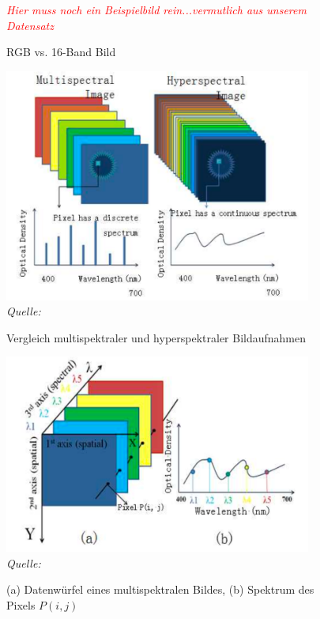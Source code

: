 \begin{figure}[H]
    \caption {RGB vs. 16-Band Bild}
    \label{fig:RGB_vs_16_Band}
    \textcolor{red}{\textit{Hier muss noch ein Beispielbild rein...vermutlich aus unserem Datensatz}}
    \\
\end{figure}

\begin{figure}[H]
    \caption {Vergleich multispektraler und hyperspektraler Bildaufnahmen}\label{fig:multispectral_hyperspectral}
    \includegraphics[width=0.9\textwidth]{abbildungen/multispectral_hyperspectral.png}
    \\
    \textit{Quelle:~\cite[][]{ibraheem.2015}}
    \\
\end{figure}

\begin{figure}[H]
    \caption {(a) Datenwürfel eines multispektralen Bildes, (b) Spektrum des Pixels \(P(i,j)\)}
    \label{fig:datacube_multispectral}
    \includegraphics[width=0.9\textwidth]{abbildungen/datacube_spectral.png}
    \\
    \textit{Quelle:~\cite[][]{ibraheem.2015}}
    \\
\end{figure}

